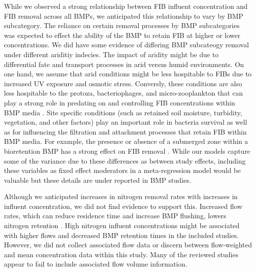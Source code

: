 \documentclass[utf8]{FrontiersinHarvard}
\begin{document}
While we observed a strong relationship between FIB influent concentration and FIB removal across all BMPs, we anticipated this relationship to vary by BMP subcategory.
The reliance on certain removal processes by BMP subcategories was expected to effect the ability of the BMP to retain FIB at higher or lower concentrations.
We did have some evidence of differing BMP subcateogy removal under different ariditiy indecies.
The impact of aridity might be due to differential fate and transport processes in arid versus humid environments.
On one hand, we assume that arid conditions might be less hospitable to FIBs due to increased UV exposure and osmotic stress.
Conversly, these conditions are also less hospitable to the protoza, bacteriophages, and micro-zooplankton that can play a strong role in predating on and controlling FIB concentrations within BMP media \citep{zhangCaptureDestructionEscherichia2010, burtchettMicrozooplanktonGrazingMeans2017, deanMetaanalysisAddressingImplications2022}.
Site specific conditions (such as retained soil moisture, turbidity, vegetation, and other factors) play an important role in bacteria survival as well as for influencing the filtration and attachment processes that retain FIB within BMP media.
For example, the presence or absence of a submerged zone within a bioretention BMP has a strong effect on FIB removal \citep{rippyMeetingCriteriaLinking2015, pengIndicatorPathogenRemoval2016}.
While our models capture some of the variance due to these differences as between study effects, including these variables as fixed effect moderators in a meta-regression model would be valuable but these details are under reported in BMP studies.

Although we anticipated increases in nitrogen removal rates with increases in influent concentration, we did not find evidence to support this.
Increased flow rates, which can reduce residence time and increase BMP flushing, lowers nitrogen retention \citep{wollheimRetentionUrbanizingHeadwater2005, craigStreamRestorationStrategies2008}.
High nitrogen influent concentrations might be associated with higher flows and decreased BMP retention times in the included studies.
However, we did not collect associated flow data or discern between flow-weighted and mean concentration data within this study.
Many of the reviewed studies appear to fail to include associated flow volume information.
\end{document}
